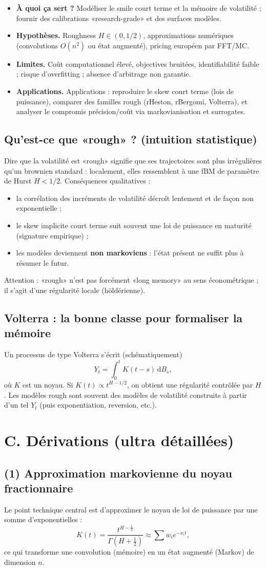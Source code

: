\documentclass[11pt,a4paper]{report}
\theoremstyle{definition}
\theoremstyle{plain}
\theoremstyle{remark}
\newcommand{\dd}{\mathrm{d}}
\newcommand{\1}{\mathbf{1}}
\newcommand{\qa}[4]{
\begin{itemize}[leftmargin=*]
\item \textbf{À quoi ça sert ?} #1
\item \textbf{Hypothèses.} #2
\item \textbf{Limites.} #3
\item \textbf{Applications.} #4
\end{itemize}
}
\begin{document}
\qa
{Modéliser le smile court terme et la mémoire de volatilité ; fournir des calibrations «research-grade» et des surfaces modèles.}
{Roughness $H\in(0,1/2)$, approximations numériques (convolutions $O(n^2)$ ou état augmenté), pricing européen par FFT/MC.}
{Coût computationnel élevé, objectives bruitées, identifiabilité faible ; risque d'overfitting ; absence d'arbitrage non garantie.}
{Applications : reproduire le skew court terme (lois de puissance), comparer des familles rough (rHeston, rBergomi, Volterra), et analyser le compromis précision/coût via markovianisation et surrogates.}

\subsection*{Qu'est-ce que «rough» ? (intuition statistique)}
Dire que la volatilité est «rough» signifie que ses trajectoires sont plus irrégulières qu'un brownien standard : localement, elles ressemblent à une fBM de paramètre de Hurst $H<1/2$.
Conséquences qualitatives :
\begin{itemize}[leftmargin=*]
\item la corrélation des incréments de volatilité décroît lentement et de façon non exponentielle ;
\item le skew implicite court terme suit souvent une loi de puissance en maturité (signature empirique) ;
\item les modèles deviennent \textbf{non markoviens} : l'état présent ne suffit plus à résumer le futur.
\end{itemize}
Attention : «rough» n'est pas forcément «long memory» au sens économétrique ; il s'agit d'une régularité locale (höldérienne).

\subsection*{Volterra : la bonne classe pour formaliser la mémoire}
Un processus de type Volterra s'écrit (schématiquement)
\[
Y_t = \int_0^t K(t-s)\,\dd B_s,
\]
où $K$ est un noyau. Si $K(t)\propto t^{H-1/2}$, on obtient une régularité contrôlée par $H$.
Les modèles rough sont souvent des modèles de volatilité construits à partir d'un tel $Y_t$ (puis exponentiation, reversion, etc.).

\section{C. Dérivations (ultra détaillées)}
\subsection*{(1) Approximation markovienne du noyau fractionnaire}
Le point technique central est d'approximer le noyau de loi de puissance par une somme d'exponentielles :
\[
K(t)=\frac{t^{H-\frac12}}{\Gamma(H+\frac12)} \approx \sum w_i e^{-x_i t},
\]
ce qui transforme une convolution (mémoire) en un état augmenté (Markov) de dimension $n$.
\end{document}

